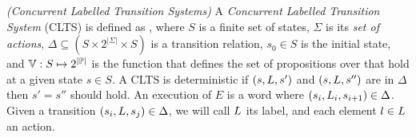 \begin{definition}
	 \emph{(Concurrent Labelled Transition Systems)} 
	A \emph{Concurrent Labelled Transition System} (CLTS) is defined as \cltsDef, where $S$ is a finite set of states, $\Sigma$ is its {\em set of actions}, $\Delta \subseteq (S \times 2^{|\Sigma|} \times S)$ is a transition relation, $s_0 \in S$ is the initial state, and $\mathbb{V} : S \mapsto  2^{|\mathbb{P}|}$ is the function that defines the set of propositions \proposition over \propositions that hold at a given state $s \in S$.  
	A CLTS is deterministic if $(s,L,s')$ and $(s,L,s'')$ are in $\Delta$ then $s'=s''$ should hold.
	An execution of $E$ is a word \executionDef where $(s_i, L_i, s_{i+1}) \in \Delta$. 
	Given a transition $(s_i, L, s_j) \in \Delta$, we will call $L$ its label, and each element $l \in L$ an action.
\end{definition}
